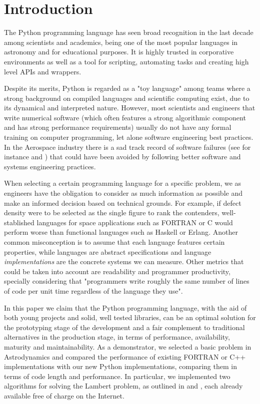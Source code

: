 \section{Introduction}

The Python programming language has seen broad recognition in the last decade among scientists and academics, being one of the most popular languages in astronomy\cite{Robitaille_2013} and for educational purposes\cite{guo2014python}. It is highly trusted in corporative environments as well as a tool for scripting, automating tasks and creating high level APIs and wrappers.

Despite its merits, Python is regarded as a "toy language" among teams where a strong background on compiled languages and scientific computing exist, due to its dynamical and interpreted nature. However, most scientists and engineers that write numerical software (which often features a strong algorithmic component and has strong performance requirements) usually do not have any formal training on computer programming, let alone software engineering best practices\cite{Wilson_2014}. In the Aerospace industry there is a sad track record of software failures (see for instance \cite{albee2000report} and \cite{lions1996report}) that could have been avoided by following better software and systems engineering practices.

When selecting a certain programming language for a specific problem, we as engineers have the obligation to consider as much information as possible and make an informed decision based on technical grounds. For example, if defect density were to be selected as the single figure to rank the contenders, well-stablished languages for space applications such as FORTRAN or C would perform worse than functional languages such as Haskell or Erlang\cite{Ray_2014}. Another common misconception is to assume that each language features certain properties, while languages are abstract specifications and language \textit{implementations} are the concrete systems we can measure. Other metrics that could be taken into account are readability and programmer productivity, specially considering that "programmers write roughly the same number of lines of code per unit time regardless of the language they use"\cite{Wilson_2014}.

In this paper we claim that the Python programming language, with the aid of both young projects and solid, well tested libraries, can be an optimal solution for the prototyping stage of the development and a fair complement to traditional alternatives in the production stage, in terms of performance, availability, maturity and maintainability. As a demonstrator, we selected a basic problem in Astrodynamics and compared the performance of existing FORTRAN or C++ implementations with our new Python implementations, comparing them in terms of code length and performance. In particular, we implemented two algorithms for solving the Lambert problem, as outlined in \cite{vallado2001fundamentals} and \cite{Izzo_2014}, each already available free of charge on the Internet.

